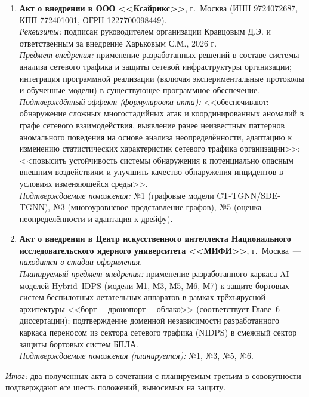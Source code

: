 \documentclass[11pt,a4paper]{article}
\begin{document}
\begin{enumerate}[leftmargin=*, itemsep=0.5em]
\item \textbf{Акт о внедрении в ООО <<Ксайрикс>>}, г.~Москва (ИНН 9724072687, КПП 772401001, ОГРН 1227700098449). \\
\textit{Реквизиты:} подписан руководителем организации Кравцовым Д.Э. и ответственным за внедрение Харьковым С.М., 2026 г. \\
\textit{Предмет внедрения:} применение разработанных решений в составе системы анализа сетевого трафика и защиты сетевой инфраструктуры организации; интеграция программной реализации (включая экспериментальные протоколы и обученные модели) в существующее программное обеспечение. \\
\textit{Подтверждённый эффект (формулировка акта):} <<обеспечивают: обнаружение сложных многостадийных атак и координированных аномалий в графе сетевого взаимодействия, выявление ранее неизвестных паттернов аномального поведения на основе анализа неопределённости, адаптацию к изменению статистических характеристик сетевого трафика организации>>; <<повысить устойчивость системы обнаружения к потенциально опасным внешним воздействиям и улучшить качество обнаружения инцидентов в условиях изменяющейся среды>>. \\
\textit{Подтверждаемые положения:} №1 (графовые модели CT-TGNN/SDE-TGNN), №3 (многоуровневое представление графов), №5 (оценка неопределённости и адаптация к дрейфу).

\item \textbf{Акт о внедрении в Центр искусственного интеллекта Национального исследовательского ядерного университета <<МИФИ>>}, г.~Москва~--- \emph{находится в стадии оформления}. \\
\textit{Планируемый предмет внедрения:} применение разработанного каркаса AI-моделей Hybrid~IDPS (модели М1, М3, М5, М6, М7) к защите бортовых систем беспилотных летательных аппаратов в рамках трёхъярусной архитектуры <<борт~-- дронопорт~-- облако>> (соответствует Главе~6 диссертации); подтверждение доменной независимости разработанного каркаса переносом из сектора сетевого трафика (NIDPS) в смежный сектор защиты бортовых систем БПЛА. \\
\textit{Подтверждаемые положения (планируется):} №1, №3, №5, №6.

\end{enumerate}

\textit{Итог:} два полученных акта в сочетании с планируемым третьим в совокупности подтверждают \emph{все} шесть положений, выносимых на защиту.

\vspace{-0.2cm}
\end{document}
